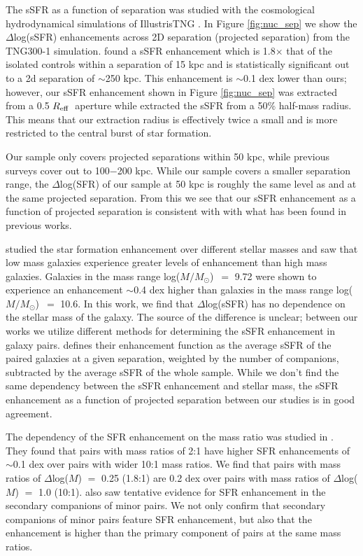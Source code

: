 \documentclass[iop,revtex4,twocolumn,apj,numberedappendix,appendixfloats]{emulateapj}
\newcommand{\reff}{$R_{\rm eff}$}
\newcommand{\logm}{log($M/M_{\odot}$)}
\begin{document}
The sSFR as a function of separation was studied with the cosmological hydrodynamical simulations of IllustrisTNG \citep{Patton:2020}. In Figure \ref{fig:nuc_sep} we show the $\Delta$log(sSFR) enhancements across 2D separation (projected separation) from the TNG300-1 simulation. \citet{Patton:2020} found a sSFR enhancement which is 1.8$\times$ that of the isolated controls within a separation of 15 kpc and is statistically significant out to a 2d separation of $\sim$250 kpc. This enhancement is $\sim$0.1 dex lower than ours; however, our sSFR enhancement shown in Figure \ref{fig:nuc_sep} was extracted from a 0.5 \reff\ aperture while \citet{Patton:2020} extracted the sSFR from a 50\% half-mass radius. This means that our extraction radius is effectively twice a small and is more restricted to the central burst of star formation. 

Our sample only covers projected separations within 50 kpc, while previous surveys cover out to 100$-$200 kpc. While our sample covers a smaller separation range, the $\Delta$log(SFR) of our sample at 50 kpc is roughly the same level as \citet{Scudder:2012} and \citet{Patton:2013} at the same projected separation. From this we see that our sSFR enhancement as a function of projected separation is consistent with with what has been found in previous works. 

\citet{Li:2008} studied the star formation enhancement over different stellar masses and saw that low mass galaxies experience greater levels of enhancement than high mass galaxies.  Galaxies in the mass range \logm\ $=$ 9.72 were shown to experience an enhancement $\sim$0.4 dex higher than galaxies in the mass range \logm\ $=$ 10.6. In this work, we find that $\Delta$log(sSFR) has no dependence on the stellar mass of the galaxy. The source of the difference is unclear; between our works we utilize different methods for determining the sSFR enhancement in galaxy pairs. \citet{Li:2008} defines their enhancement function as the average sSFR of the paired galaxies at a given separation, weighted by the number of companions, subtracted by the average sSFR of the whole sample. While we don't find the same dependency between the sSFR enhancement and stellar mass, the sSFR enhancement as a function of projected separation between our studies is in good agreement.

The dependency of the SFR enhancement on the mass ratio was studied in \citet{Ellison:2008}. They found that pairs with mass ratios of 2:1 have higher SFR enhancements of $\sim$0.1 dex over pairs with wider 10:1 mass ratios. We find that pairs with mass ratios of $\Delta$log($M$) $=$ 0.25 (1.8:1) are 0.2 dex over pairs with mass ratios of $\Delta$log($M$) $=$ 1.0 (10:1). \citet{Ellison:2008} also saw tentative evidence for SFR enhancement in the secondary companions of minor pairs. We not only confirm that secondary companions of minor pairs feature SFR enhancement, but also that the enhancement is higher than the primary component of pairs at the same mass ratios. 
\end{document}
